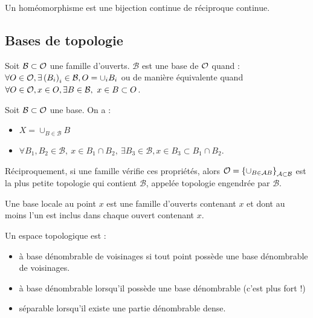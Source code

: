 \documentclass{cours}
\begin{document}
\begin{definition}
    Un homéomorphisme est une bijection continue de réciproque continue.
\end{definition}

\subsection{Bases de topologie}
\begin{definition}
    Soit $\mathcal{B} \subset \mathcal{O}$ une famille d'ouverts. $\mathcal{B}$ est une base de $\mathcal{O}$ quand : $\forall O \in \mathcal{O}, \exists \left(B_{i}\right)_{i}\in \mathcal{B}, O = \cup_{i} B_{i}$ ou de manière équivalente quand $\forall O \in \mathcal{O}, x \in O, \exists B \in \mathcal{B},\ x \in B \subset O$.
\end{definition}

\begin{theorem}
    Soit $\mathcal{B} \subset \mathcal{O}$ une base. On a :
    \begin{itemize}
        \item $X = \cup_{B \in \mathcal{B}} B$
        \item $\forall B_{1}, B_{2} \in \mathcal{B},\ x \in B_{1} \cap B_{2},\ \exists B_{3} \in \mathcal{B}, x \in B_{3} \subset B_{1} \cap B_{2}$.
    \end{itemize}
    Réciproquement, si une famille vérifie ces propriétés, alors $\mathcal{O} = \left\{\cup_{B \in \mathcal{A} B}\right\}_{\mathcal{A} \subset \mathcal{B}}$ est la plus petite topologie qui contient $\mathcal{B}$, appelée topologie engendrée par $\mathcal{B}$.
\end{theorem}

\begin{definition}
    Une base locale au point $x$ est une famille d'ouverts contenant $x$ et dont au moins l'un est inclus dans chaque ouvert contenant $x$.
\end{definition}

\begin{definition}
    Un espace topologique est :
    \begin{itemize}
        \item à base dénombrable de voisinages si tout point possède une base dénombrable de voisinages.
        \item à base dénombrable lorsqu'il possède une base dénombrable (c’est plus fort !)
        \item séparable lorsqu'il existe une partie dénombrable dense.
    \end{itemize}
\end{definition}
\end{document}
